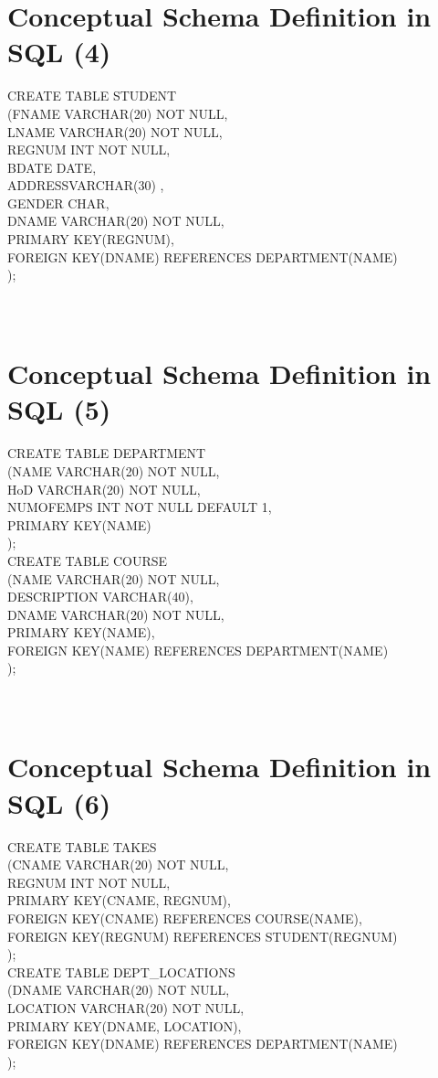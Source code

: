 \documentclass[12pt]{article}
\begin{document}
\section{Conceptual Schema Definition in SQL (4)}
CREATE TABLE STUDENT\\
(FNAME VARCHAR(20) NOT NULL,\\
LNAME VARCHAR(20) NOT NULL,\\
REGNUM   INT NOT NULL,\\
BDATE DATE,\\
ADDRESSVARCHAR(30) ,\\
GENDER CHAR,\\
DNAME VARCHAR(20) NOT NULL,\\
PRIMARY KEY(REGNUM),\\
FOREIGN KEY(DNAME) REFERENCES DEPARTMENT(NAME)\\
);\\
\\ 
 \\
\section{Conceptual Schema Definition in SQL (5)}
CREATE TABLE DEPARTMENT\\
(NAME VARCHAR(20) NOT NULL,\\
HoD VARCHAR(20) NOT NULL,\\
NUMOFEMPS INT NOT NULL DEFAULT 1,\\
PRIMARY KEY(NAME)\\
);\\
CREATE TABLE COURSE\\
(NAME VARCHAR(20) NOT NULL,\\
DESCRIPTION VARCHAR(40),\\
DNAME VARCHAR(20) NOT NULL,\\
PRIMARY KEY(NAME),\\
FOREIGN KEY(NAME) REFERENCES DEPARTMENT(NAME)\\
);\\
\\ 
 \\
\section{Conceptual Schema Definition in SQL (6)}
CREATE TABLE TAKES\\
(CNAME VARCHAR(20) NOT NULL,\\
REGNUM INT NOT NULL,\\
PRIMARY KEY(CNAME, REGNUM),\\
FOREIGN KEY(CNAME)    REFERENCES COURSE(NAME),\\
FOREIGN KEY(REGNUM) REFERENCES STUDENT(REGNUM)\\
);\\
CREATE TABLE DEPT\_LOCATIONS\\
(DNAME VARCHAR(20) NOT NULL,\\
LOCATION VARCHAR(20) NOT NULL,\\
PRIMARY KEY(DNAME, LOCATION),\\
FOREIGN KEY(DNAME) REFERENCES DEPARTMENT(NAME)\\
);\\
\\ 
 \\
\end{document}
